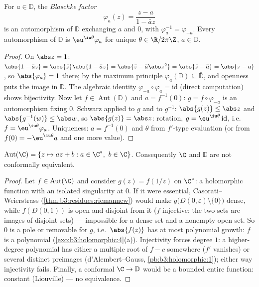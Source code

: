 \begin{theorem}
\label{thm:b3:conformal:autdisc}
For $a \in \mathbb D$, the \emph{Blaschke
factor}
\[
\varphi_a(z) = \frac{z - a}{1 - \bar a z}
\]
is an automorphism of $\mathbb D$ exchanging $a$ and $0$, with
$\varphi_a^{-1} = \varphi_{-a}$. Every automorphism of
$\mathbb D$ is $\eu^{\iu\theta}\varphi_a$ for unique $\theta
\in \R/2\pi\Z$, $a \in \mathbb D$.
\end{theorem}

\begin{proof}
On $\abs z = 1$: $\abs{1 - \bar az} = \abs{\bar z}\abs{1 -
\bar az} = \abs{\bar z - \bar a\abs z^2} = \abs{\bar z - \bar
a} = \abs{z - a}$, so $\abs{\varphi_a} = 1$ there; by the
maximum principle $\varphi_a(\mathbb D) \subseteq \bar{\mathbb
D}$, and openness puts the image in $\mathbb D$. The algebraic
identity $\varphi_{-a}\circ\varphi_a = \mathrm{id}$ (direct
computation) shows bijectivity. Now let $f \in
\operatorname{Aut}(\mathbb D)$ and $a = f^{-1}(0)$: $g =
f\circ\varphi_{-a}$ is an automorphism fixing $0$. Schwarz
applied to $g$ and to $g^{-1}$: $\abs{g(z)} \leq \abs z$ and
$\abs{g^{-1}(w)} \leq \abs w$, so $\abs{g(z)} = \abs z$:
rotation, $g = \eu^{\iu\theta}\,\mathrm{id}$, i.e.\ $f =
\eu^{\iu\theta}\varphi_a$. Uniqueness: $a = f^{-1}(0)$ and
$\theta$ from $f'$-type evaluation (or from $f(0) =
-\eu^{\iu\theta}a$ and one more value).
\end{proof}

\begin{theorem}
\label{thm:b3:conformal:autplane}
$\operatorname{Aut}(\C) = \{z \mapsto az + b : a \in \C^*,\ b
\in \C\}$. Consequently $\C$ and $\mathbb D$ are not
conformally equivalent.
\end{theorem}

\begin{proof}
Let $f \in \operatorname{Aut}(\C)$ and consider $g(z) =
f(1/z)$ on $\C^*$: a holomorphic function with an isolated
singularity at $0$. If it were essential,
Casorati--Weierstrass (\cref{thm:b3:residues:riemanncw}) would
make $g\bigl(D(0,\varepsilon)\setminus\{0\}\bigr)$ dense,
while $f(D(0, 1))$ is open and disjoint from it ($f$
injective: the two sets are images of disjoint sets) ---
impossible for a dense set and a nonempty open set. So $0$ is
a pole or removable for $g$, i.e.\ $\abs{f(z)}$ has at most
polynomial growth: $f$ is a polynomial
(\cref{exo:b3:holomorphic:4}(a)). Injectivity forces degree
$1$: a higher-degree polynomial has either a multiple root of
$f - c$ somewhere ($f'$ vanishes) or several distinct
preimages (d'Alembert--Gauss, \cref{pb:b3:holomorphic:1});
either way injectivity fails. Finally, a conformal $\C \to
\mathbb D$ would be a bounded entire function: constant
(Liouville) --- no equivalence.
\end{proof}

